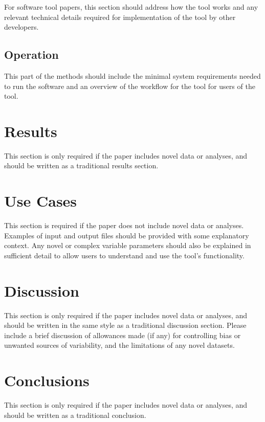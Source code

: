 \documentclass[9pt,a4paper,]{extarticle}
\begin{document}
For software tool papers, this section should address how the tool works and any relevant technical details required for implementation of the tool by other developers.

\subsection{Operation}\label{operation}

This part of the methods should include the minimal system requirements needed to run the software and an overview of the workflow for the tool for users of the tool.

\section{Results }\label{results}

This section is only required if the paper includes novel data or analyses, and should be written as a traditional results section.

\section{Use Cases }\label{use-cases}

This section is required if the paper does not include novel data or analyses.
Examples of input and output files should be provided with some explanatory context. Any novel or complex variable parameters should also be explained in sufficient detail to allow users to understand and use the tool's functionality.

\section{Discussion }\label{discussion}

This section is only required if the paper includes novel data or analyses, and should be written in the same style as a traditional discussion section.
Please include a brief discussion of allowances made (if any) for controlling bias or unwanted sources of variability, and the limitations of any novel datasets.

\section{Conclusions }\label{conclusions}

This section is only required if the paper includes novel data or analyses, and should be written as a traditional conclusion.
\end{document}

